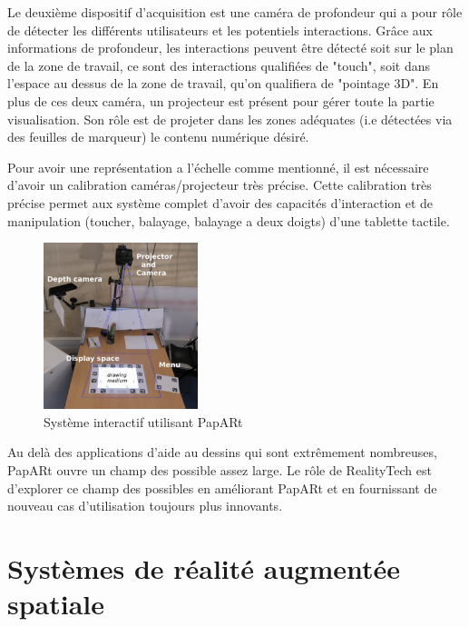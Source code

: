 Le deuxième dispositif d'acquisition est une caméra de profondeur qui a pour rôle de détecter les différents utilisateurs et les potentiels interactions. Grâce aux informations de profondeur, les interactions peuvent être détecté soit sur le plan de la zone de travail, ce sont des interactions qualifiées de "touch", soit dans l'espace au dessus de la zone de travail, qu'on qualifiera de "pointage 3D".
En plus de ces deux caméra, un projecteur est présent pour gérer toute la partie visualisation. Son rôle est de projeter dans les zones adéquates (i.e détectées via des feuilles de marqueur) le contenu numérique désiré. 

Pour avoir une représentation a l'échelle comme mentionné, il est nécessaire d'avoir un calibration caméras/projecteur très précise. Cette calibration très précise permet aux système complet d'avoir des capacités d'interaction et de manipulation (toucher, balayage, balayage a deux doigts) d'une tablette tactile.

\begin{figure}[H]
\centering
\includegraphics[width=0.4\textwidth]{images/papart-system}
\caption{Système interactif utilisant PapARt\protect\footnotemark}
\label{fig:papartsystem}
\end{figure}


Au delà des applications d'aide au dessins qui sont extrêmement nombreuses, PapARt ouvre un champ des possible assez large. Le rôle de RealityTech est d'explorer ce champ des possibles en améliorant PapARt et en fournissant de nouveau cas d'utilisation toujours plus innovants.



\section{Systèmes de réalité augmentée spatiale}
\label{sec:SARother}
